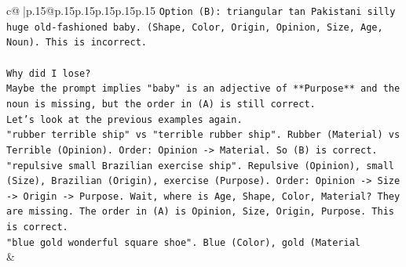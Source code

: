 \documentclass{article}
\begin{document}
{\begin{supertabular}{c@{$\;$}|p{.15\linewidth}@{}p{.15\linewidth}p{.15\linewidth}p{.15\linewidth}p{.15\linewidth}p{.15\linewidth}}
{{{\texttt{Option (B): triangular tan Pakistani silly huge old{-}fashioned baby. (Shape, Color, Origin, Opinion, Size, Age, Noun). This is incorrect.} \\
\\ 
\texttt{Why did I lose?} \\
\texttt{Maybe the prompt implies "baby" is an adjective of **Purpose** and the noun is missing, but the order in (A) is still correct.} \\
\texttt{Let's look at the previous examples again.} \\
\texttt{"rubber terrible ship" vs "terrible rubber ship". Rubber (Material) vs Terrible (Opinion). Order: Opinion {-}> Material. So (B) is correct.} \\
\texttt{"repulsive small Brazilian exercise ship". Repulsive (Opinion), small (Size), Brazilian (Origin), exercise (Purpose). Order: Opinion {-}> Size {-}> Origin {-}> Purpose. Wait, where is Age, Shape, Color, Material? They are missing. The order in (A) is Opinion, Size, Origin, Purpose. This is correct.} \\
\texttt{"blue gold wonderful square shoe". Blue (Color), gold (Material} \\
            }
        }
    }
    & \\ \\

\end{supertabular}
}
\end{document}
